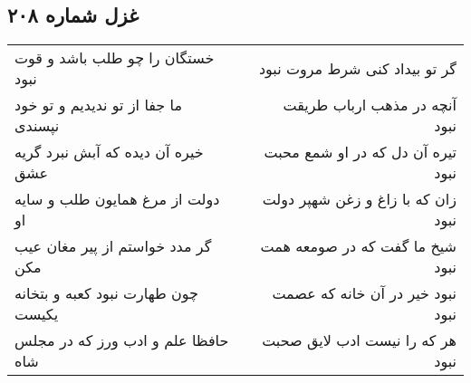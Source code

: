 \begin{center}
\section*{غزل شماره ۲۰۸}
\label{sec:sh208}
\begin{longtable}{l p{0.5cm} r}
خستگان را چو طلب باشد و قوت نبود
&&
گر تو بیداد کنی شرط مروت نبود
\\
ما جفا از تو ندیدیم و تو خود نپسندی
&&
آنچه در مذهب ارباب طریقت نبود
\\
خیره آن دیده که آبش نبرد گریه عشق
&&
تیره آن دل که در او شمع محبت نبود
\\
دولت از مرغ همایون طلب و سایه او
&&
زان که با زاغ و زغن شهپر دولت نبود
\\
گر مدد خواستم از پیر مغان عیب مکن
&&
شیخ ما گفت که در صومعه همت نبود
\\
چون طهارت نبود کعبه و بتخانه یکیست
&&
نبود خیر در آن خانه که عصمت نبود
\\
حافظا علم و ادب ورز که در مجلس شاه
&&
هر که را نیست ادب لایق صحبت نبود
\\
\end{longtable}
\end{center}
